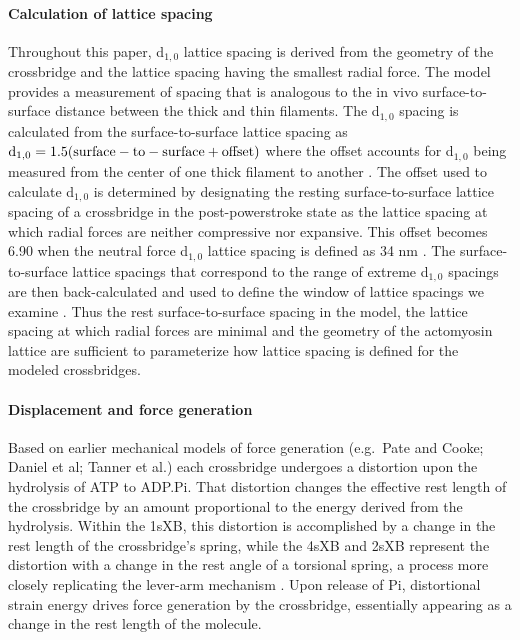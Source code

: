 \documentclass[]{article}
\begin{document}
\paragraph{Calculation of lattice spacing} %
Throughout this paper, d$_{1,0}$ lattice spacing is derived from the geometry of the crossbridge and the lattice spacing having the smallest radial force. 
The model provides a measurement of spacing that is analogous to the in vivo surface-to-surface distance between the thick and thin filaments.
The d$_{1,0}$ spacing is calculated from the surface-to-surface lattice spacing as $\rm{d}_{1,0} = 1.5 (surface-to-surface + offset)$ where the offset accounts for d$_{1,0}$ being measured from the center of one thick filament to another \citep{Millman1998}.
The offset used to calculate d$_{1,0}$ is determined by designating the resting surface-to-surface lattice spacing of a crossbridge in the post-powerstroke state as the lattice spacing at which radial forces are neither compressive nor expansive.  
This offset becomes 6.90 when the neutral force d$_{1,0}$ lattice spacing is defined as 34 nm \citep{Brenner1991}. 
The surface-to-surface lattice spacings that correspond to the range of extreme d$_{1,0}$ spacings are then back-calculated and used to define the window of lattice spacings we examine \citep{Millman1998}. %
Thus the rest surface-to-surface spacing in the model, the lattice spacing at which radial forces are minimal and the geometry of the actomyosin lattice are sufficient to parameterize how lattice spacing is defined for the modeled crossbridges. 

\paragraph{Displacement and force generation} %
Based on earlier mechanical models of force generation (e.g.\ Pate and Cooke; Daniel et al; Tanner et al.) each crossbridge undergoes a distortion upon the hydrolysis of ATP to ADP.Pi.  
That distortion changes the effective rest length of the crossbridge by an amount proportional to the energy derived from the hydrolysis.  
Within the 1sXB, this distortion is accomplished by a change in the rest length of the crossbridge's spring, while the 4sXB and 2sXB represent the distortion with a change in the rest angle of a torsional spring, a process more closely replicating the lever-arm mechanism \citep{Reedy2000}.
Upon release of Pi, distortional strain energy drives force generation by the crossbridge, essentially appearing as a change in the rest length of the molecule.
\end{document}
